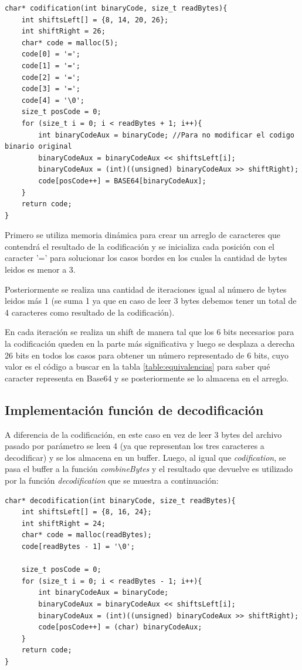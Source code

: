 \documentclass[titlepage,a4paper]{article}
\begin{document}
\begin{lstlisting}[style=customC]
char* codification(int binaryCode, size_t readBytes){
	int shiftsLeft[] = {8, 14, 20, 26};
	int shiftRight = 26;
	char* code = malloc(5);
	code[0] = '=';
	code[1] = '=';
	code[2] = '=';
	code[3] = '=';
	code[4] = '\0';
	size_t posCode = 0;
	for (size_t i = 0; i < readBytes + 1; i++){
		int binaryCodeAux = binaryCode; //Para no modificar el codigo binario original
		binaryCodeAux = binaryCodeAux << shiftsLeft[i];
		binaryCodeAux = (int)((unsigned) binaryCodeAux >> shiftRight);
		code[posCode++] = BASE64[binaryCodeAux];
	}
	return code;
}
\end{lstlisting}

Primero se utiliza memoria dinámica para crear un arreglo de caracteres que contendrá el resultado de la codificación y se inicializa cada posición con el caracter '=' para solucionar los casos bordes en los cuales la cantidad de bytes leidos es menor a 3. \newline

Posteriormente se realiza una cantidad de iteraciones igual al número de bytes leidos más 1 (se suma 1 ya que en caso de leer 3 bytes debemos tener un total de 4 caracteres como resultado de la codificación). \newline

En cada iteración se realiza un shift de manera tal que los 6 bits necesarios para la codificación queden en la parte más significativa y luego se desplaza a derecha 26 bits en todos los casos para obtener un número representado de 6 bits, cuyo valor es el código a buscar en la tabla \ref{table:equivalencias} para saber qué caracter representa en Base64 y se posteriormente se lo almacena en el arreglo. \newline


\subsection{Implementación función de decodificación}

A diferencia de la codificación, en este caso en vez de leer 3 bytes del archivo pasado por parámetro se leen 4 (ya que representan los tres caracteres a decodificar) y se los almacena en un buffer.
Luego, al igual que \textit{codification}, se pasa el buffer a la función \textit{combineBytes} y el resultado que devuelve es utilizado por la función \textit{decodification} que se muestra a continuación:

\begin{lstlisting}[style=customC]
char* decodification(int binaryCode, size_t readBytes){
	int shiftsLeft[] = {8, 16, 24};
	int shiftRight = 24; 
	char* code = malloc(readBytes);
	code[readBytes - 1] = '\0';

	size_t posCode = 0;
	for (size_t i = 0; i < readBytes - 1; i++){
		int binaryCodeAux = binaryCode;
		binaryCodeAux = binaryCodeAux << shiftsLeft[i];
		binaryCodeAux = (int)((unsigned) binaryCodeAux >> shiftRight);
		code[posCode++] = (char) binaryCodeAux;
	}
	return code;
}
\end{lstlisting}
\end{document}

